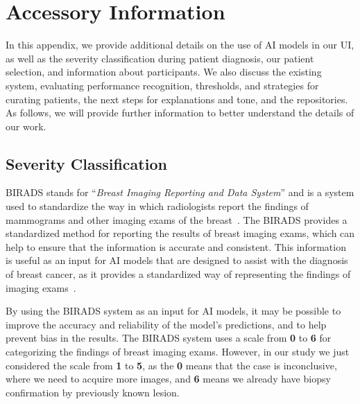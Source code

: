 \chapter{Accessory Information}
\label{chap:app001}

In this appendix, we provide additional details on the use of AI models in our UI, as well as the severity classification during patient diagnosis, our patient selection, and information about participants.
We also discuss the existing system, evaluating performance recognition, thresholds, and strategies for curating patients, the next steps for explanations and tone, and the repositories.
As follows, we will provide further information to better understand the details of our work.

\section{Severity Classification}
\label{sec:app001001}

BIRADS stands for ``{\it Breast Imaging Reporting and Data System}'' and is a system used to standardize the way in which radiologists report the findings of mammograms and other imaging exams of the breast~\cite{SPAK2017179, mckinney2020international}.
The BIRADS provides a standardized method for reporting the results of breast imaging exams, which can help to ensure that the information is accurate and consistent.
This information is useful as an input for AI models that are designed to assist with the diagnosis of breast cancer, as it provides a standardized way of representing the findings of imaging exams~\cite{MAICAS2019101562}.

By using the BIRADS system as an input for AI models, it may be possible to improve the accuracy and reliability of the model's predictions, and to help prevent bias in the results.
The BIRADS system uses a scale from {\bf 0} to {\bf 6} for categorizing the findings of breast imaging exams.
However, in our study we just considered the scale from {\bf 1} to {\bf 5}, as the {\bf 0} means that the case is inconclusive, where we need to acquire more images, and {\bf 6} means we already have biopsy confirmation by previously known lesion.

\vspace{1.5mm}

